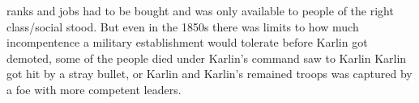 \documentclass[12pt]{book}
\begin{document}
ranks and jobs had to be bought and was only available to people of the right class/social stood. But even in the 1850s there was limits to how much incompentence a military establishment would tolerate before Karlin got demoted, some of the people died under Karlin's command saw to Karlin Karlin got hit by a stray bullet, or Karlin and Karlin's remained troops was captured by a foe with more competent leaders.
\end{document}
